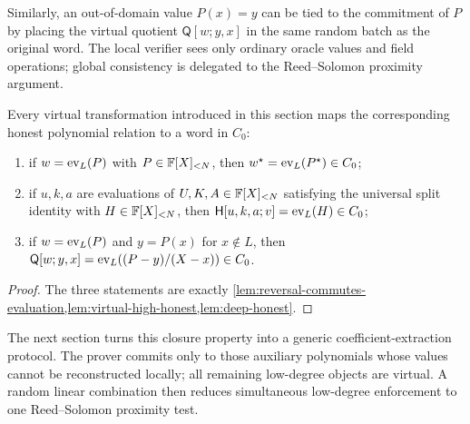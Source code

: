 Similarly, an out-of-domain value $P(x)=y$ can be tied to the commitment of $P$ by placing the virtual quotient $\mathsf Q[w;y,x]$ in the same random batch as the original word.  The local verifier sees only ordinary oracle values and field operations; global consistency is delegated to the Reed--Solomon proximity argument.

\begin{proposition}
\label{prop:honest-virtual-closure}
Every virtual transformation introduced in this section maps the corresponding honest polynomial relation to a word in $C_0$:
\begin{enumerate}[label=(\arabic*),leftmargin=*]
  \item if $w=\operatorname{ev}_L(P)$ with $P\in\mathbb{F}[X]_{<N}$, then $w^{\star}=\operatorname{ev}_L(P^{\star})\in C_0$;
  \item if $u,k,a$ are evaluations of $U,K,A\in\mathbb{F}[X]_{<N}$ satisfying the universal split identity with $H\in\mathbb{F}[X]_{<N}$, then $\mathsf H[u,k,a;v]=\operatorname{ev}_L(H)\in C_0$;
  \item if $w=\operatorname{ev}_L(P)$ and $y=P(x)$ for $x\notin L$, then $\mathsf Q[w;y,x]=\operatorname{ev}_L((P-y)/(X-x))\in C_0$.
\end{enumerate}
\end{proposition}

\begin{proof}
The three statements are exactly \cref{lem:reversal-commutes-evaluation,lem:virtual-high-honest,lem:deep-honest}.
\end{proof}

The next section turns this closure property into a generic coefficient-extraction protocol.  The prover commits only to those auxiliary polynomials whose values cannot be reconstructed locally; all remaining low-degree objects are virtual.  A random linear combination then reduces simultaneous low-degree enforcement to one Reed--Solomon proximity test.
